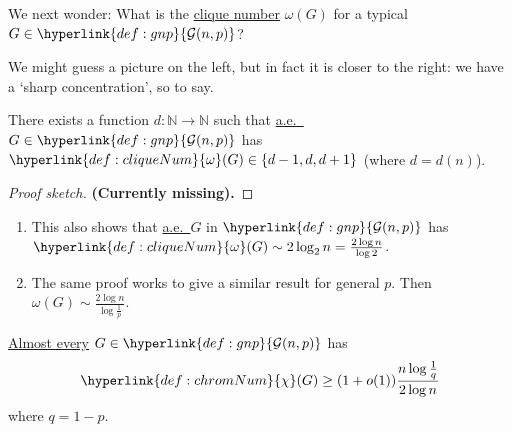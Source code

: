 \documentclass{article}
\begin{document}
We next wonder: What is the \hyperlink{def:cliqueNum}{clique number} $\omega(G)$ for a typical $G \in \hyperlink{def:gnp}{\mathcal{G}(n,p)}$?
\begin{center}
\end{center}
We might guess a picture on the left, but in fact it is closer to the right: we have a `sharp concentration', so to say.
\begin{nthm}\label{thm:41}
    There exists a function $d: \mathbb{N} \to \mathbb{N}$ such that \hyperlink{def:ae}{a.e.\ }$G \in \hyperlink{def:gnp}{\mathcal{G}(n,p)}$ has $\hyperlink{def:cliqueNum}{\omega}(G) \in \{d-1,d,d+1\}$ (where $d = d(n)$).
\end{nthm}
\begin{proof}[Proof sketch]
    \textbf{(Currently missing).}
\end{proof}
\begin{remark} \leavevmode
    \begin{enumerate}
        \item This also shows that \hyperlink{def:ae}{a.e.\ }$G$ in $\hyperlink{def:gnp}{\mathcal{G}(n,p)}$ has $\hyperlink{def:cliqueNum}{\omega}(G) \sim 2 \log_2 n = \frac{2 \log n}{\log 2}$.
        \item The same proof works to give a similar result for general $p$. Then $\omega(G) \sim \frac{2 \log n}{\log \frac{1}{p}}$.
    \end{enumerate}
\end{remark}
\begin{ncor}\label{cor:42}
    \hyperlink{def:ae}{Almost every} $G \in \hyperlink{def:gnp}{\mathcal{G}(n,p)}$ has
    \begin{equation*}
        \hyperlink{def:chromNum}{\chi}(G) \geq (1 + o(1))\frac{n \log \frac{1}{q}}{2 \log n}
    \end{equation*}
    where $q = 1-p.$
\end{ncor}
\end{document}
